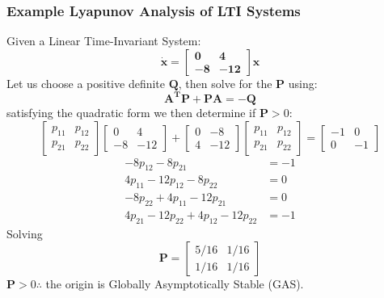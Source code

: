 \documentclass[11pt,handout]{beamer}   %
\begin{document}
\begin{frame}
\frametitle{Example Lyapunov Analysis of LTI Systems}
\small
Given a Linear Time-Invariant System:
\begin{equation*}
\mathbf{\dot{x} = \begin{bmatrix}
0 & 4 \\ -8 & -12
\end{bmatrix}x}
\end{equation*}
Let us choose a positive definite $\mathbf{Q}$, then solve for the $\mathbf{P}$ using:
\begin{equation*}
\mathbf{A^T P + P A = -Q}
\end{equation*}
satisfying the quadratic form we then determine if $\mathbf{P}>0$:
\begin{equation*} 
\begin{bmatrix}
p_{11} & p_{12}\\p_{21} & p_{22}
\end{bmatrix} 
\begin{bmatrix}
0 & 4 \\ -8 & -12
\end{bmatrix}
+
\begin{bmatrix}
0 & -8 \\ 4 & -12
\end{bmatrix}
\begin{bmatrix}
p_{11} & p_{12}\\p_{21} & p_{22}
\end{bmatrix}  = 
\begin{bmatrix}
-1 & 0 \\ 0 & -1\end{bmatrix} 
\end{equation*}
\begin{equation*}
\begin{aligned}
-8 p_{12} - 8 p_{21} &= -1\\
4 p_{11} -12 p_{12} - 8 p_{22} &= 0\\
-8 p_{22} + 4 p_{11} -12 p_{21} & = 0\\
4 p_{21} -12 p_{22} + 4 p_{12} -12 p_{22} &= -1
\end{aligned}
\end{equation*}
Solving 
\begin{equation*}
\mathbf{P} = \begin{bmatrix}
5/16 & 1/16 \\
1/16 & 1/16
\end{bmatrix}
\end{equation*}
$\mathbf{P} >0 \therefore$  the origin is Globally Asymptotically Stable (GAS).
\end{frame}
\end{document}
